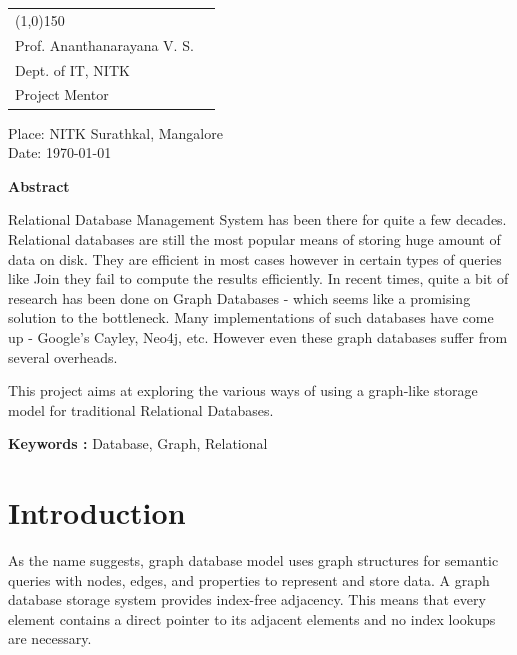\documentclass[12pt, oneside]{book}
\begin{document}
\\
\\
\begin{tabular}{l@{\hskip 4cm} r}
	\line(1,0){150} \\
	 Prof. Ananthanarayana V. S. \\
	 Dept. of IT, NITK \\
	 Project Mentor \\ 
\end{tabular}

\vspace{4cm}
\begin{flushleft}
Place: NITK Surathkal, Mangalore \\
Date: \today
\end{flushleft}
\pagebreak
\thispagestyle{empty}
\begin{center}
	\textbf{ \huge Abstract}
\end{center}
\vspace{1cm}
Relational Database Management System has been there for quite a few decades. Relational databases are still the most popular means of storing huge amount of data on disk. They are efficient in most cases however in certain types of queries like Join they fail to compute the results efficiently. In recent times, quite a bit of research has been done on Graph Databases - which seems like a promising solution to the bottleneck. Many implementations of such databases have come up - Google's Cayley, Neo4j, etc. However even these graph databases suffer from several overheads.
\par
This project aims at exploring the various ways of using a graph-like storage model for traditional Relational Databases. \\
\par
\textbf{Keywords : }Database, Graph, Relational

\thispagestyle{empty}
\listoffigures
\tableofcontents

\setcounter{page}{1}

\chapter{Introduction}
As the name suggests, graph database model uses graph structures for semantic queries with nodes, edges, and properties to represent and store data. A graph database storage system provides index-free adjacency. This means that every element contains a direct pointer to its adjacent elements and no index lookups are necessary.
\end{document}
